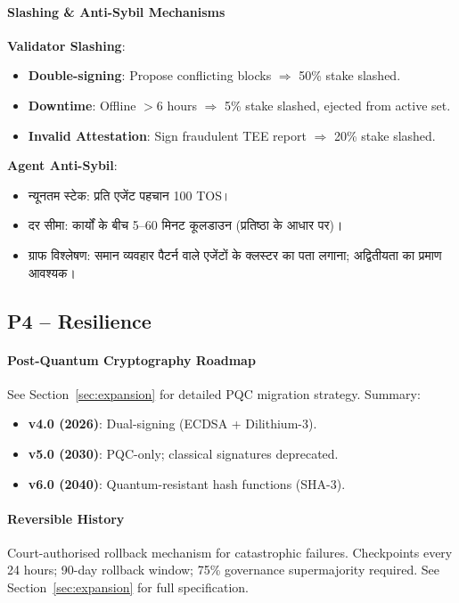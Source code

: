 \documentclass[11pt]{article}
\begin{document}
\begin{itemize}[noitemsep]
\begin{itemize}[noitemsep]
\paragraph{Slashing \& Anti-Sybil Mechanisms}
\textbf{Validator Slashing}:
\begin{itemize}[noitemsep]
  \item \textbf{Double-signing}: Propose conflicting blocks $\Rightarrow$ 50\% stake slashed.
  \item \textbf{Downtime}: Offline $>$6 hours $\Rightarrow$ 5\% stake slashed, ejected from active set.
  \item \textbf{Invalid Attestation}: Sign fraudulent TEE report $\Rightarrow$ 20\% stake slashed.
\end{itemize}

\textbf{Agent Anti-Sybil}:
\begin{itemize}[noitemsep]
  \item न्यूनतम स्टेक: प्रति एजेंट पहचान 100 TOS।
  \item दर सीमा: कार्यों के बीच 5--60 मिनट कूलडाउन (प्रतिष्ठा के आधार पर)।
  \item ग्राफ विश्लेषण: समान व्यवहार पैटर्न वाले एजेंटों के क्लस्टर का पता लगाना; अद्वितीयता का प्रमाण आवश्यक।
\end{itemize}

\subsection{P4 -- Resilience}
\label{sec:pillar-resilience}

\paragraph{Post-Quantum Cryptography Roadmap}
See Section~\ref{sec:expansion} for detailed PQC migration strategy. Summary:
\begin{itemize}[noitemsep]
  \item \textbf{v4.0 (2026)}: Dual-signing (ECDSA + Dilithium-3).
  \item \textbf{v5.0 (2030)}: PQC-only; classical signatures deprecated.
  \item \textbf{v6.0 (2040)}: Quantum-resistant hash functions (SHA-3).
\end{itemize}

\paragraph{Reversible History}
Court-authorised rollback mechanism for catastrophic failures. Checkpoints every 24 hours; 90-day rollback window; 75\% governance supermajority required. See Section~\ref{sec:expansion} for full specification.


\end{itemize}
\end{itemize}
\end{document}
